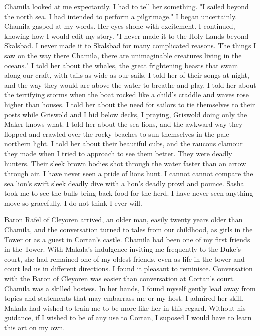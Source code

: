 \documentclass{article}
\begin{document}
Chamila looked at me expectantly. I had to tell her something. "I sailed beyond the north sea. I had intended to perform a pilgrimage." I began uncertainly. Chamila gasped at my words. Her eyes shone with excitement. I continued, knowing how I would edit my story. "I never made it to the Holy Lands beyond Skalsbad. I never made it to Skalsbad for many complicated reasons. The things I saw on the way there Chamila, there are unimaginable creatures living in the oceans." I told her about the whales, the great frightening beasts that swam along our craft, with tails as wide as our sails. I told her of their songs at night, and the way they would arc above the water to breathe and play. I told her about the terrifying storms when the boat rocked like a child's craddle and waves rose higher than houses. I told her about the need for sailors to tie themselves to their posts while Griswold and I hid below decks, I praying, Griswold doing only the Maker knows what. I told her about the sea lions, and the awkward way they flopped and crawled over the rocky beaches to sun themselves in the pale northern light. I told her about their beautiful cubs, and the raucous clamour they made when I tried to approach to see them better. They were deadly hunters. Their sleek brown bodies shot through the water faster than an arrow through air. I have never seen a pride of lions hunt. I cannot cannot compare the sea lion's swift sleek deadly dive with a lion's deadly prowl and pounce. Sasha took me to see the bulls bring back food for the herd. I have never seen anything move so gracefully. I do not think I ever will.

Baron Rafel of Cleyoren arrived, an older man, easily twenty years older than Chamila, and the conversation turned to tales from our childhood, as girls in the Tower or as a guest in Cortan's castle. Chamila had been one of my first friends in the Tower. With Makala's indulgence inviting me frequently to the Duke's court, she had remained one of my oldest friends, even as life in the tower and court led us in different directions. I found it pleasant to reminisce. Conversation with the Baron of Cleyoren was easier than conversation at Cortan's court. Chamila was a skilled hostess. In her hands, I found myself gently lead away from topics and statements that may embarrass me or my host. I admired her skill. Makala had wished to train me to be more like her in this regard. Without his guidance, if I wished to be of any use to Cortan, I suposed I would have to learn this art on my own.
\end{document}
